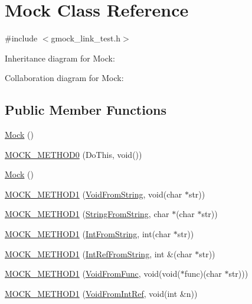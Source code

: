 \hypertarget{class_mock}{}\section{Mock Class Reference}
\label{class_mock}


{\ttfamily \#include $<$gmock\+\_\+link\+\_\+test.\+h$>$}



Inheritance diagram for Mock\+:


Collaboration diagram for Mock\+:
\subsection*{Public Member Functions}
\begin{DoxyCompactItemize}
\item 
\hyperlink{class_mock_a2b9528f2e7fcf9738201a5ea667c1998}{Mock} ()
\item 
\hyperlink{class_mock_ae710f23cafb1a2f17772e8805d6312d2}{M\+O\+C\+K\+\_\+\+M\+E\+T\+H\+O\+D0} (Do\+This, void())
\item 
\hyperlink{class_mock_a2b9528f2e7fcf9738201a5ea667c1998}{Mock} ()
\item 
\hyperlink{class_mock_ada59eea6991953353f332e3ea1e74444}{M\+O\+C\+K\+\_\+\+M\+E\+T\+H\+O\+D1} (\hyperlink{class_interface_a65d6ae604e7e9a513aec72c9c94e0b97}{Void\+From\+String}, void(char $\ast$str))
\item 
\hyperlink{class_mock_a2db4d82b6f92b4e462929f651ac4c3b1}{M\+O\+C\+K\+\_\+\+M\+E\+T\+H\+O\+D1} (\hyperlink{class_interface_a756b1d22c12aa3f14a5083f90043fbf0}{String\+From\+String}, char $\ast$(char $\ast$str))
\item 
\hyperlink{class_mock_ae73b4ee90bf6d84205d2b1c17f0b8433}{M\+O\+C\+K\+\_\+\+M\+E\+T\+H\+O\+D1} (\hyperlink{class_interface_ab34c8a5fd2236a6b009f86a4e5851b61}{Int\+From\+String}, int(char $\ast$str))
\item 
\hyperlink{class_mock_a2cece30a3ea92b34f612f8032fe3a0f9}{M\+O\+C\+K\+\_\+\+M\+E\+T\+H\+O\+D1} (\hyperlink{class_interface_ab93276de67e60c44fd775d4c139aa8e1}{Int\+Ref\+From\+String}, int \&(char $\ast$str))
\item 
\hyperlink{class_mock_ac70c052254fa9816bd759c006062dc47}{M\+O\+C\+K\+\_\+\+M\+E\+T\+H\+O\+D1} (\hyperlink{class_interface_a7dab3c82b857a9a5f52b3ce6f7df547f}{Void\+From\+Func}, void(void($\ast$func)(char $\ast$str)))
\item 
\hyperlink{class_mock_ae2379efbc030f1adf8b032be3bdf081d}{M\+O\+C\+K\+\_\+\+M\+E\+T\+H\+O\+D1} (\hyperlink{class_interface_aa43fb56650a57b6b3e7743e54e50cb86}{Void\+From\+Int\+Ref}, void(int \&n))

\end{DoxyCompactItemize}
